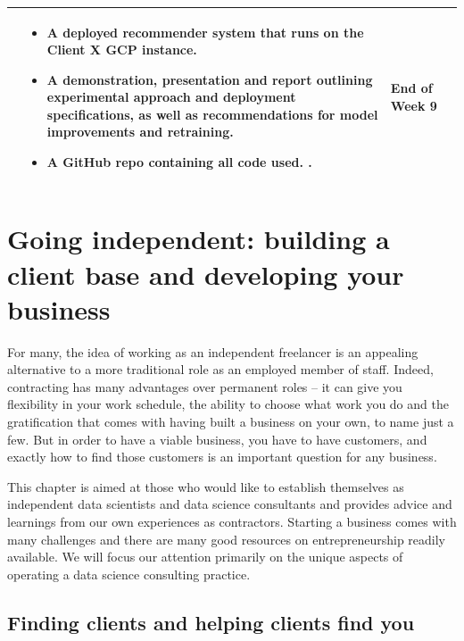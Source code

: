 \documentclass[
]{book}
\providecommand{\tightlist}{%
  \setlength{\itemsep}{0pt}\setlength{\parskip}{0pt}}
\begin{document}
\begin{longtable}[]{@{}llll@{}}
\begin{minipage}[t]{0.30\columnwidth}
\end{minipage} & \begin{minipage}[t]{0.30\columnwidth}\raggedright
\begin{itemize}
\tightlist
\item
  A deployed recommender system that runs on the Client X GCP instance.
\item
  A demonstration, presentation and report outlining experimental
  approach and deployment specifications, as well as recommendations for
  model improvements and retraining.
\item
  A GitHub repo containing all code used. .
\end{itemize}\strut
\end{minipage} & \begin{minipage}[t]{0.15\columnwidth}\raggedright
End of Week 9\strut
\end{minipage}\tabularnewline
\bottomrule
\end{longtable}

\hypertarget{consulting}{%
\chapter{Going independent: building a client base and developing your
business}\label{consulting}}

For many, the idea of working as an independent freelancer is an
appealing alternative to a more traditional role as an employed member
of staff. Indeed, contracting has many advantages over permanent roles
-- it can give you flexibility in your work schedule, the ability to
choose what work you do and the gratification that comes with having
built a business on your own, to name just a few. But in order to have a
viable business, you have to have customers, and exactly how to find
those customers is an important question for any business.

This chapter is aimed at those who would like to establish themselves as
independent data scientists and data science consultants and provides
advice and learnings from our own experiences as contractors. Starting a
business comes with many challenges and there are many good resources on
entrepreneurship readily available. We will focus our attention
primarily on the unique aspects of operating a data science consulting
practice.

\hypertarget{finding-clients-and-helping-clients-find-you}{%
\section{Finding clients and helping clients find
you}\label{finding-clients-and-helping-clients-find-you}}
\end{document}
